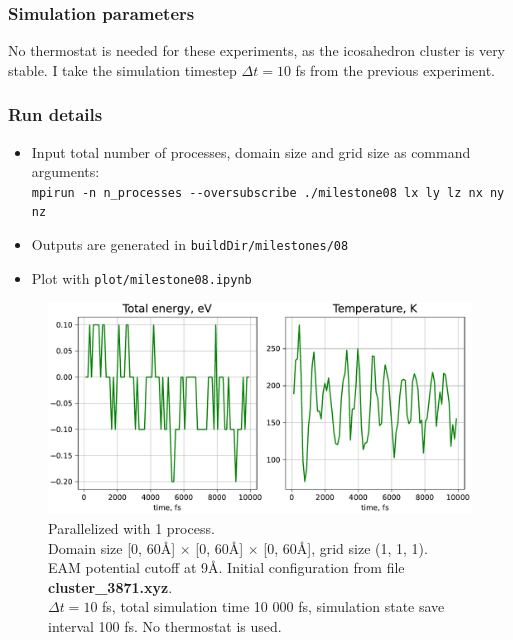 \documentclass[12pt,a4paper]{article}
\begin{document}
\subsubsection*{Simulation parameters}

No thermostat is needed for these experiments, as the icosahedron cluster is very stable. I take the simulation timestep $\Delta t = 10$ fs from the previous experiment. 



\subsubsection*{Run details}
\begin{itemize}
	\item Input total number of processes, domain size and grid size as command arguments:\\
	\verb|mpirun -n n_processes --oversubscribe ./milestone08 lx ly lz nx ny nz|
	\item Outputs are generated in \verb|buildDir/milestones/08|
	\item Plot with \verb|plot/milestone08.ipynb|
\end{itemize}

\begin{figure}[h!]
	\centering
	\includegraphics[width=.8\linewidth]{img/milestone08-1proc.pdf}
	\caption{Parallelized with 1 process.\\
	Domain size [0, 60Å] $\times$ [0, 60Å] $\times$ [0, 60Å], grid size (1, 1, 1).\\
	EAM potential cutoff at 9Å. Initial configuration from file {\bf cluster\_3871.xyz}.\\
	$\Delta t = 10$ fs, total simulation time 10 000 fs, simulation state save interval 100 fs. No thermostat is used.}
	\label{fig:parallel-1}
\end{figure}
\end{document}
